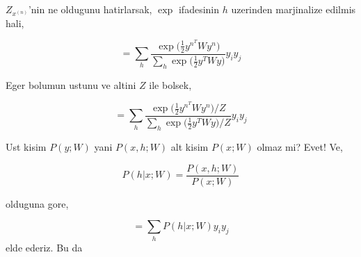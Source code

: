 \documentclass[12pt,fleqn]{article}\usepackage{../common}
\begin{document}
$Z_{x^{(n)}}$'nin ne oldugunu hatirlarsak, $\exp$ ifadesinin $h$ uzerinden
marjinalize edilmis hali,

$$ 
= \sum_h  \frac{\exp \big( \frac{1}{2} y^{n^T} W y^n  \big)}
{\sum_h \exp \big( \frac{1}{2} y^T W y \big) } 
y_iy_j
$$

Eger bolumun ustunu ve altini $Z$ ile bolsek,

$$ 
= \sum_h  
\frac{\exp \big( \frac{1}{2} y^{n^T} W y^n  \big) / Z} 
{\sum_h \exp \big( \frac{1}{2} y^T W y \big) / Z} 
y_iy_j
$$

Ust kisim $P(y;W)$ yani $P(x,h;W) $ alt kisim $P(x;W)$ olmaz mi? Evet! Ve,


$$ P(h|x;W) = \frac{P(x,h;W)}{P(x;W)}  $$

olduguna gore, 

$$ =  \sum_h P(h|x;W) y_iy_j $$
elde ederiz. Bu da 
\end{document}
